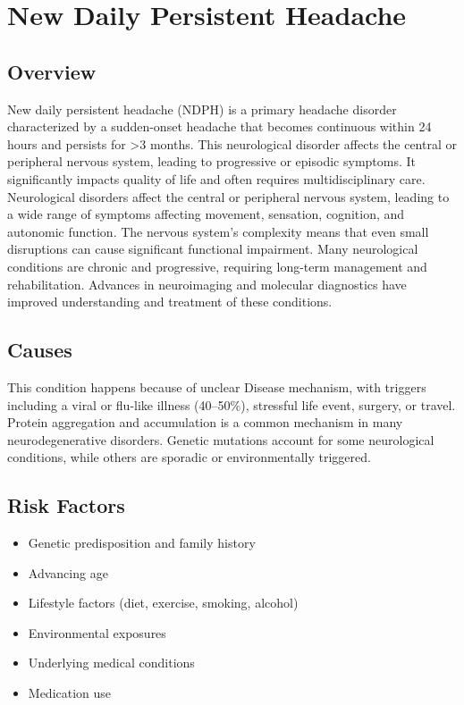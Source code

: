 \chapter{New Daily Persistent Headache}
\label{sec:New Daily Persistent Headache}

\section{Overview}
New daily persistent headache (NDPH) is a primary headache disorder characterized by a sudden-onset headache that becomes continuous within 24 hours and persists for >3 months. This neurological disorder affects the central or peripheral nervous system, leading to progressive or episodic symptoms. It significantly impacts quality of life and often requires multidisciplinary care. Neurological disorders affect the central or peripheral nervous system, leading to a wide range of symptoms affecting movement, sensation, cognition, and autonomic function. The nervous system's complexity means that even small disruptions can cause significant functional impairment. Many neurological conditions are chronic and progressive, requiring long-term management and rehabilitation. Advances in neuroimaging and molecular diagnostics have improved understanding and treatment of these conditions.
\section{Causes}
This condition happens because of unclear Disease mechanism, with triggers including a viral or flu-like illness (40--50\%), stressful life event, surgery, or travel.    Protein aggregation and accumulation is a common mechanism in many neurodegenerative disorders.  Genetic mutations account for some neurological conditions, while others are sporadic or environmentally triggered.   
\section{Risk Factors}
\begin{itemize}[noitemsep]
  \item Genetic predisposition and family history
  \item Advancing age
  \item Lifestyle factors (diet, exercise, smoking, alcohol)
  \item Environmental exposures
  \item Underlying medical conditions
  \item Medication use
\end{itemize}
